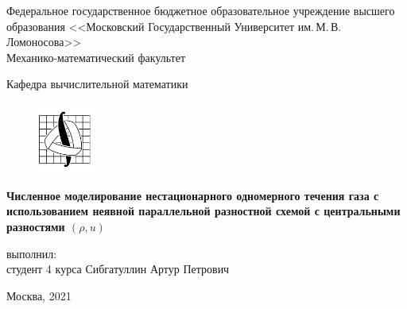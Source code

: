 \begin{titlepage}
	\begin{center}

		Федеральное государственное бюджетное образовательное учреждение высшего образования 
		<<Московский Государственный Университет им.\,М.\,В.\,Ломоносова>>\\
		
		Механико-математический факультет
		
		Кафедра вычислительной математики\\[0.6cm]
		
		\begin{figure}[!htp]
				\begin{center}
						{\includegraphics[width=20mm]{pics/mmlogo.png}}
					\end{center}
			\end{figure}
		
		\vspace{3cm}
			
		{\bf Численное моделирование нестационарного одномерного течения газа с использованием неявной параллельной разностной схемой с центральными разностями $(\rho, u)$}
		
		\vspace{5cm}
		\begin{flushright}
			{ выполнил:}\\
			студент 4 курса Сибгатуллин Артур Петрович\\[0.5cm]
		\end{flushright}
		\vspace{1cm}
		
		\normalsize Москва, 2021
	\end{center}
\end{titlepage}
